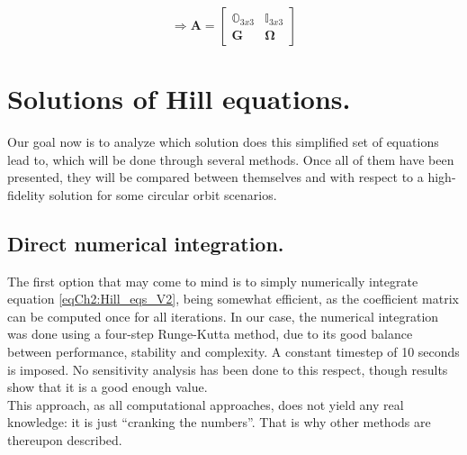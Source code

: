 	\begin{equation}
	\Rightarrow \bm A = \left[ \begin{array}{c|c}
	\mathbb{O}_{3x3} 	& \mathbb{I}_{3x3}\\
	\hline
	\bm G 				& \bm \Omega
	\end{array}\right]
	\label{eqCh3:A_G_omega}
	\end{equation}
\section{Solutions of Hill equations.}
%
%
\indent Our goal now is to analyze which solution does this simplified set of equations lead to, which will be done through several methods. Once all of them have been presented, they will be compared between themselves and with respect to a high-fidelity solution for some circular orbit scenarios.
%
	\subsection{Direct numerical integration.}
	\indent The first option that may come to mind is to simply numerically integrate equation \eqref{eqCh2:Hill_eqs_V2}, being somewhat efficient, as the coefficient matrix can be computed once for all iterations. In our case, the numerical integration was done using a four-step Runge-Kutta method, due to its good balance between performance, stability and complexity. A constant timestep of 10 seconds is imposed. No sensitivity analysis has been done to this respect, though results show that it is a good enough value.\\
	\indent This approach, as all computational approaches, does not yield any real knowledge: it is just ``cranking the numbers''. That is why other methods are thereupon described.
